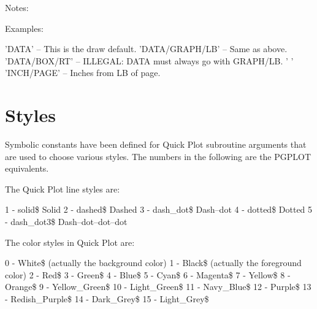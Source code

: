Notes:
Examples:
\begin{example}
  'DATA'          -- This is the draw default. 
  'DATA/GRAPH/LB' -- Same as above.
  'DATA/BOX/RT'   -- ILLEGAL: DATA must always go with GRAPH/LB.
  '%
  '%
  'INCH/PAGE'     -- Inches from LB of page.
\end{example}

\section{Styles}
\label{s:styles}

Symbolic constants have been defined for Quick Plot subroutine arguments that
are used to choose various styles. The numbers in the following are the
PGPLOT equivalents.

\noindent
The Quick Plot line styles are:
\begin{example}
    1 - solid\$                  Solid
    2 - dashed\$                 Dashed
    3 - dash_dot\$               Dash--dot 
    4 - dotted\$                 Dotted
    5 - dash_dot3\$              Dash--dot--dot--dot        
\end{example}

\noindent
The color styles in Quick Plot are:
\begin{example}
    0 - White\$   (actually the background color)
    1 - Black\$   (actually the foreground color)
    2 - Red\$
    3 - Green\$
    4 - Blue\$
    5 - Cyan\$
    6 - Magenta\$
    7 - Yellow\$ 
    8 - Orange\$
    9 - Yellow_Green\$
   10 - Light_Green\$
   11 - Navy_Blue\$
   12 - Purple\$
   13 - Redish_Purple\$
   14 - Dark_Grey\$
   15 - Light_Grey\$
\end{example}

